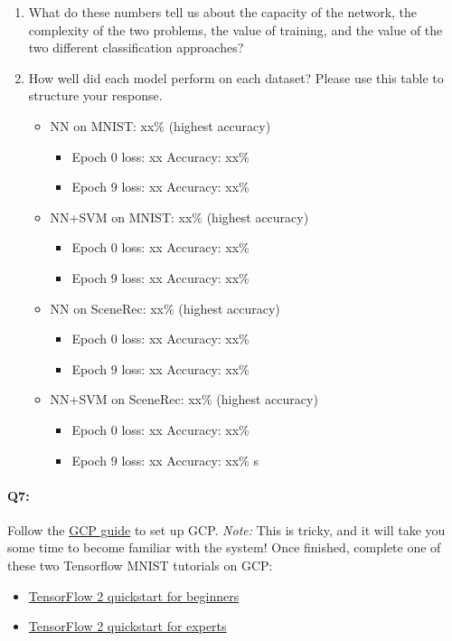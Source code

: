 \begin{enumerate}
    \item What do these numbers tell us about the capacity of the network, the complexity of the two problems, the value of training, and the value of the two different classification approaches?

    \item How well did each model perform on each dataset? Please use this table to structure your response.

    \begin{itemize}
        \item NN on MNIST: xx\% (highest accuracy)
        	\begin{itemize}
        	\item Epoch 0 loss: xx     Accuracy: xx\%
        	\item Epoch 9 loss: xx     Accuracy: xx\%
        	\end{itemize}
        \item NN+SVM on MNIST: xx\% (highest accuracy)
        	\begin{itemize}
        	\item Epoch 0 loss: xx     Accuracy: xx\%
        	\item Epoch 9 loss: xx     Accuracy: xx\%
        	\end{itemize}
        \item NN on SceneRec: xx\% (highest accuracy)
        	\begin{itemize}
        	\item Epoch 0 loss: xx     Accuracy: xx\%
        	\item Epoch 9 loss: xx     Accuracy: xx\%
        	\end{itemize}
        \item NN+SVM on SceneRec: xx\% (highest accuracy)
        	\begin{itemize}
        	\item Epoch 0 loss: xx     Accuracy: xx\%
        	\item Epoch 9 loss: xx     Accuracy: xx\%
    	    s\end{itemize}
    \end{itemize}

\end{enumerate}


\pagebreak
\paragraph{Q7:} Follow the \href{https://browncsci1430.github.io/webpage/resources/gcp_guide/}{GCP guide} to set up GCP. \emph{Note:} This is tricky, and it will take you some time to become familiar with the system! Once finished, complete one of these two Tensorflow MNIST tutorials on GCP:
\begin{itemize}
	\item \href{https://www.tensorflow.org/tutorials/quickstart/beginner}{TensorFlow 2 quickstart for beginners}
	\item \href{https://www.tensorflow.org/tutorials/quickstart/advanced}{TensorFlow 2 quickstart for experts}
\end{itemize}

